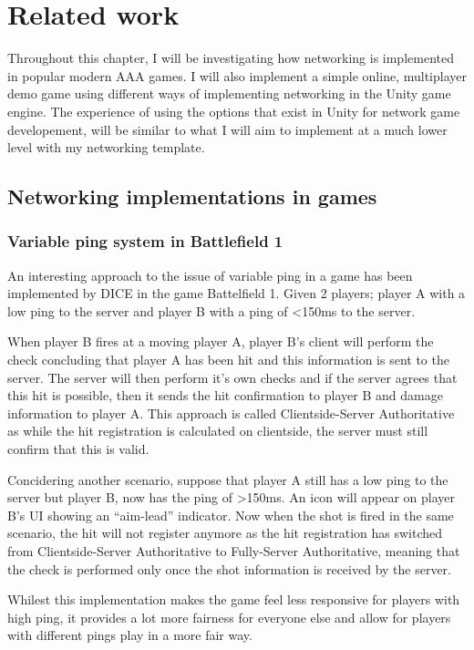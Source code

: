 


\chapter{Related work}
Throughout this chapter, I will be investigating how networking is implemented in popular modern AAA games. I will also implement a simple online, multiplayer demo game using different ways of implementing networking in the Unity game engine. The experience of using the options that exist in Unity for network game developement, will be similar to what I will aim to implement at a much lower level with my networking template.

\section{Networking implementations in games}

\subsection{Variable ping system in Battlefield 1} \label{sec:bf1_ping}
An interesting approach to the issue of variable ping in a game has been implemented by DICE in the game Battelfield 1. Given 2 players; player A with a low ping to the server and player B with a ping of <150ms to the server.

When player B fires at a moving player A, player B's client will perform the check concluding that player A has been hit and this information is sent to the server. The server will then perform it's own checks and if the server agrees that this hit is possible, then it sends the hit confirmation to player B and damage information to player A. This approach is called Clientside-Server Authoritative as while the hit registration is calculated on clientside, the server must still confirm that this is valid.

Concidering another scenario, suppose that player A still has a low ping to the server but player B, now has the ping of >150ms. An icon will appear on player B's UI showing an ``aim-lead'' indicator. Now when the shot is fired in the same scenario, the hit will not register anymore as the hit registration has switched from Clientside-Server Authoritative to Fully-Server Authoritative, meaning that the check is performed only once the shot information is received by the server.

Whilest this implementation makes the game feel less responsive for players with high ping, it provides a lot more fairness for everyone else and allow for players with different pings play in a more fair way.


